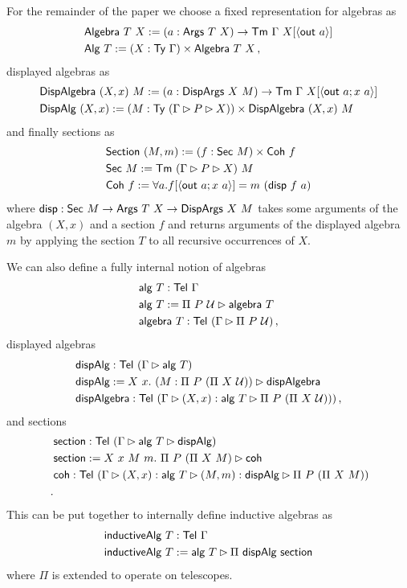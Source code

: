 For the remainder of the paper we choose a fixed representation for algebras as
\begin{align*}
    &\mta{Algebra}\ T\ X := (a : \mta{Args}\ T\ X) \to \Tm\ \Gamma\ X[\Msub{\mta{out}\ a}] \\
    &\mta{Alg}\ T := (X : \Ty\ \Gamma) \times \mta{Algebra}\ T\ X \,,
\end{align*}
displayed algebras as
\begin{align*}
    &\textsf{DispAlgebra}\ (X, x)\ M := (a : \textsf{DispArgs}\ X\ M) \to \textsf{Tm}\ \Gamma\ X[\langle\textsf{out}\ a; x\ a\rangle] \\
    &\textsf{DispAlg}\ (X, x) := (M : \textsf{Ty}\ (\Gamma \rhd P \rhd X)) \times \textsf{DispAlgebra}\ (X, x)\ M
\end{align*}
and finally sections as
\begin{align*}
    &\mta{Section}\ (M, m) := (f : \mta{Sec}\ M) \times \mta{Coh}\ f \\
    &\mta{Sec}\ M := \Tm\ (\Gamma \rhd P \rhd X)\ M \\
    &\mta{Coh}\ f := \forall a. f[\Msub{\mta{out}\ a; x\ a}] = m\ (\mta{disp}\ f\ a)
\end{align*}
where $\textsf{disp} : \textsf{Sec}\ M \to \textsf{Args}\ T\ X \to \textsf{DispArgs}\ X\ M$
takes some arguments of the algebra $(X, x)$ and a section $f$ and returns
arguments of the displayed algebra $m$ by applying the section $T$ to all
recursive occurrences of $X$.

We can also define a fully internal notion of algebras
\begin{align*}
    &\textsf{alg}\ T : \textsf{Tel}\ \Gamma \\
    &\textsf{alg}\ T := \Pi\ P\ \mathcal{U} \rhd \textsf{algebra}\ T \\
    &\textsf{algebra}\ T : \textsf{Tel}\ (\Gamma \rhd \Pi\ P\ \mathcal{U}) \,,
\end{align*}
displayed algebras
\begin{align*}
    &\textsf{dispAlg} : \textsf{Tel}\ (\Gamma \rhd \textsf{alg}\ T) \\
    &\textsf{dispAlg} := X\ x.\ (M : \Pi\ P\ (\Pi\ X\ \mathcal{U})) \rhd \textsf{dispAlgebra} \\
    &\textsf{dispAlgebra} : \textsf{Tel}\ (\Gamma \rhd (X, x) : \textsf{alg}\ T \rhd \Pi\ P\ (\Pi\ X\ \mathcal{U})))  \,,
\end{align*}
and sections
\begin{align*}
    &\textsf{section} : \textsf{Tel}\ (\Gamma \rhd \textsf{alg}\ T \rhd \textsf{dispAlg}) \\
    &\textsf{section} := X\ x\ M\ m.\ \Pi\ P\ (\Pi\ X\ M) \rhd \textsf{coh} \\
    &\textsf{coh} : \textsf{Tel}\ (\Gamma \rhd (X, x) : \textsf{alg}\ T\rhd (M, m) : \textsf{dispAlg} \rhd \Pi\ P\ (\Pi\ X\ M)) \\ \,.
\end{align*}
This can be put together to internally define inductive algebras as
\begin{align*}
    &\mta{inductiveAlg}\ T : \Tel\ \Gamma \\
    &\mta{inductiveAlg}\ T := \mta{alg}\ T \rhd \Pi\ \mta{dispAlg}\ \mta{section}
\end{align*}
where $\Pi$ is extended to operate on telescopes.

